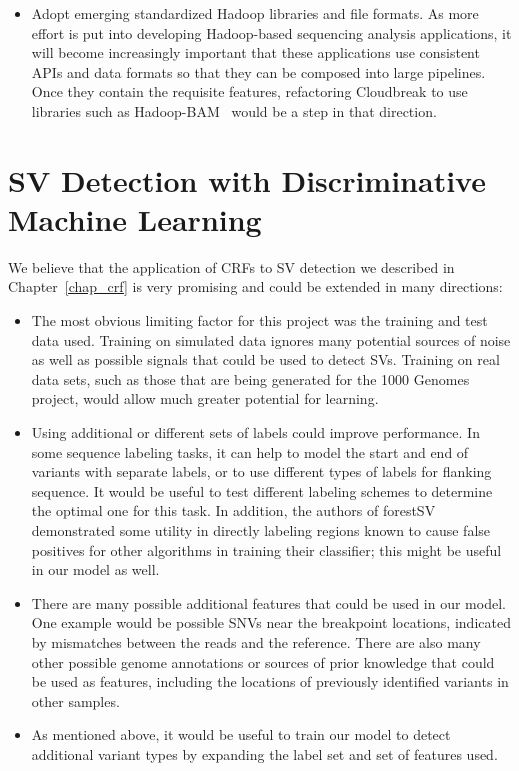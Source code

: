 \begin{itemize}
 \item Adopt emerging standardized Hadoop libraries and file formats. As more effort is put into developing Hadoop-based sequencing analysis applications, it will become increasingly important that these applications use consistent APIs and data formats so that they can be composed into large pipelines. Once they contain the requisite features, refactoring Cloudbreak to use libraries such as Hadoop-BAM~\cite{Niemenmaa:2012hu} would be a step in that direction.
\end{itemize}

\section{SV Detection with Discriminative Machine Learning}

We believe that the application of CRFs to SV detection we described in Chapter~\ref{chap_crf} is very promising and could be extended in many directions:

\begin{itemize}
\item The most obvious limiting factor for this project was the training and test data used. Training on simulated data ignores many potential sources of noise as well as possible signals that could be used to detect SVs. Training on real data sets, such as those that are being generated for the 1000 Genomes project, would allow much greater potential for learning.
\item Using additional or different sets of labels could improve performance. In some sequence labeling tasks, it can help to model the start and end of variants with separate labels, or to use different types of labels for flanking sequence. It would be useful to test different labeling schemes to determine the optimal one for this task. In addition, the authors of forestSV~\cite{Michaelson:2012fj} demonstrated some utility in directly labeling regions known to cause false positives for other algorithms in training their classifier; this might be useful in our model as well.
\item There are many possible additional features that could be used in our model. One example would be possible SNVs near the breakpoint locations, indicated by mismatches between the reads and the reference. There are also many other possible genome annotations or sources of prior knowledge that could be used as features, including the locations of previously identified variants in other samples.
\item As mentioned above, it would be useful to train our model to detect additional variant types by expanding the label set and set of features used.
\end{itemize}

